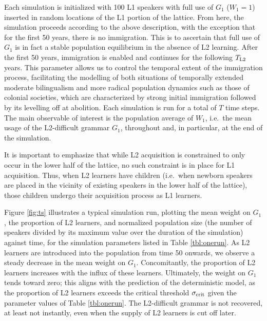 Each simulation is initialized with 100 L1 speakers with full use of
\(G_1\) (\(W_1 = 1\)) inserted in random locations of the L1 portion of
the lattice. From here, the simulation proceeds according to the above
description, with the exception that for the first 50 years, there is no
immigration. This is to ascertain that full use of \(G_1\) is in fact a
stable population equilibrium in the absence of L2 learning. After the
first 50 years, immigration is enabled and continues for the following
\(T_\textnormal{L2}\) years. This parameter allows us to control the
temporal extent of the immigration process, facilitating the modelling
of both situations of temporally extended moderate bilingualism and more
radical population dynamics such as those of colonial societies, which
are characterized by strong initial immigration followed by its
levelling off at abolition. Each simulation is run for a total of \(T\)
time steps. The main observable of interest is the population average of
\(W_1\), i.e.~the mean usage of the L2-difficult grammar \(G_1\),
throughout and, in particular, at the end of the simulation.

It is important to emphasize that while L2 acquisition is constrained to
only occur in the lower half of the lattice, no such constraint is in
place for L1 acquisition. Thus, when L2 learners have children
(i.e.~when newborn speakers are placed in the vicinity of existing
speakers in the lower half of the lattice), those children undergo their
acquisition process as L1 learners.

Figure \ref{fig:ts} illustrates a typical simulation run, plotting the
mean weight on \(G_1\), the proportion of L2 learners, and normalized
population size (the number of speakers divided by its maximum value
over the duration of the simulation) against time, for the simulation
parameters listed in Table \ref{tbl:onerun}. As L2 learners are
introduced into the population from time 50 onwards, we observe a steady
decrease in the mean weight on \(G_1\). Concomitantly, the proportion of
L2 learners increases with the influx of these learners. Ultimately, the
weight on \(G_1\) tends toward zero; this aligns with the prediction of
the deterministic model, as the proportion of L2 learners exceeds the
critical threshold \(\sigma_\textnormal{crit}\) given the parameter
values of Table \ref{tbl:onerun}. The L2-difficult grammar is not
recovered, at least not instantly, even when the supply of L2 learners
is cut off later.

